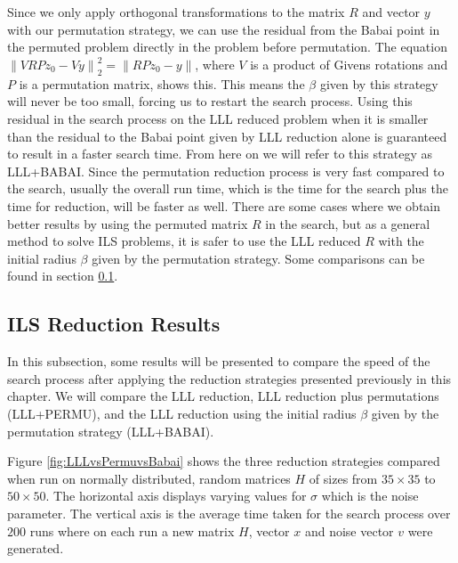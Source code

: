 \documentclass[12pt,Bold,letterpaper]{mcgilletdclass}
\newcommand{\vsp}{\vspace{\baselineskip}}
\begin{document}
Since we only apply orthogonal transformations to the matrix $R$ and vector $y$ with our permutation strategy, we can use the residual from the Babai point in the permuted problem directly in the problem before permutation. The equation $\left \| VRPz_0 - Vy \right \|_2^2 = \left \| RPz_0 - y \right \|$, where $V$ is a product of Givens rotations and $P$ is a permutation matrix, shows this. This means the $\beta$ given by this strategy will never be too small, forcing us to restart the search process. Using this residual in the search process on the LLL reduced problem when it is smaller than the residual to the Babai point given by LLL reduction alone is guaranteed to result in a faster search time. From here on we will refer to this strategy as LLL+BABAI. Since the permutation reduction process is very fast compared to the search, usually the overall run time, which is the time for the search plus the time for reduction, will be faster as well. There are some cases where we obtain better results by using the permuted matrix $R$ in the search, but as a general method to solve ILS problems, it is safer to use the LLL reduced $R$ with the initial radius $\beta$ given by the permutation strategy. Some comparisons can be found in section \ref{sec:ILSReductionResults}.

\vsp \subsection{ILS Reduction Results} \label{sec:ILSReductionResults}
In this subsection, some results will be presented to compare the speed of the search process after applying the reduction strategies presented previously in this chapter. We will compare the LLL reduction, LLL reduction plus permutations (LLL+PERMU), and the LLL reduction using the initial radius $\beta$ given by the permutation strategy (LLL+BABAI).

Figure \ref{fig:LLLvsPermuvsBabai} shows the three reduction strategies compared when run on normally distributed, random matrices $H$ of sizes from $35 \times 35$ to $50 \times 50$. The horizontal axis displays varying values for $\sigma$ which is the noise parameter. The vertical axis is the average time taken for the search process over $200$ runs where on each run a new matrix $H$, vector $x$ and noise vector $v$ were generated.
\end{document}
